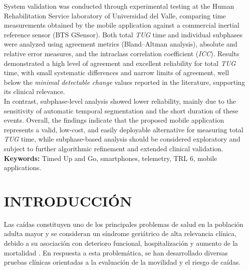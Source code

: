 \documentclass[12pt]{report}
\begin{document}
\begin{justify}
    System validation was conducted through experimental testing at the Human Rehabilitation Service laboratory of Universidad del Valle, comparing time measurements obtained by the mobile application against a commercial inertial reference sensor (BTS GSensor). Both total \textit{TUG} time and individual subphases were analyzed using agreement metrics (Bland--Altman analysis), absolute and relative error measures, and the intraclass correlation coefficient (\textit{ICC}). Results demonstrated a high level of agreement and excellent reliability for total \textit{TUG} time, with small systematic differences and narrow limits of agreement, well below the \textit{minimal detectable change} values reported in the literature, supporting its clinical relevance.\\

    In contrast, subphase-level analysis showed lower reliability, mainly due to the sensitivity of automatic temporal segmentation and the short duration of these events. Overall, the findings indicate that the proposed mobile application represents a valid, low-cost, and easily deployable alternative for measuring total \textit{TUG} time, while subphase-based analysis should be considered exploratory and subject to further algorithmic refinement and extended clinical validation.\\


    \vspace{0.5cm}
    \noindent\textbf{Keywords:} Timed Up and Go, smartphones, telemetry, TRL 6, mobile applications.




    \clearpage

    \chapter{INTRODUCCIÓN}

    Las caídas constituyen uno de los principales problemas de salud en la población adulta mayor y se consideran un síndrome geriátrico de alta relevancia clínica, debido a su asociación con deterioro funcional, hospitalización y aumento de la mortalidad \cite{falls-in-elderly}. En respuesta a esta problemática, se han desarrollado diversas pruebas clínicas orientadas a la evaluación de la movilidad y el riesgo de caídas.\\


\end{justify}
\end{document}
